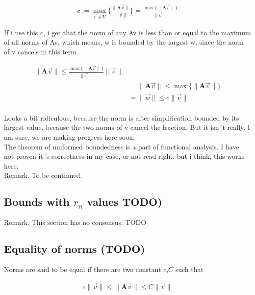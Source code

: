 \documentclass[a4paper]{article}
\begin{document}
\begin{Example}
\begin{displaymath}
\begin{align}
c := \max_{\vec{v} \in V}\{ \frac{\|\boldsymbol{A}\vec{v}\|}{\|\vec{v}\|} \} = \frac{\max\{\|\boldsymbol{A}\vec{v}\|\}}{\|\vec{v}\|}
\end{align}
\end{displaymath}

If i use this c, i get that the norm of any Av is less than or equal to the maximum of all norms of Av, which means, w is bounded by the largest w, since the norm of v cancels in this term.

\begin{displaymath}
\begin{align}
\|\boldsymbol{A}\vec{v}\| \leq \frac{\max\{\|\boldsymbol{A}\vec{v}\|\}}{\|\vec{v}\|}\|\vec{v}\| \\
&= \|\boldsymbol{A}\vec{v}\| \leq \max\{\|\boldsymbol{A}\vec{v}\|\}\\
&= \|\vec{w}\| \leq c\|\vec{v}\| \\
\end{align}
\end{displaymath}

Looks a bit ridiculous, because the norm is after simplification bounded by its largest value, because the two norms of v cancel the fraction. But it isn´t really. I am sure, we are making progress here soon.\\

The theorem of uniformed boundedness is a part of functional analysis. I have not proven it´s correctness in my case, or not read right, but i think, this works here.\\

Remark. To be continued.\\


\subsection{Bounds with $r_n$ values TODO)}

Remark. This section has no consensus. TODO

\subsection{Equality of norms (TODO)}

Norms are said to be equal if there are two constant $c$,$C$ such that

\begin{displaymath}
\begin{align}
    c\|\vec{v}\| \leq \|\boldsymbol{A}\vec{v}\| \leq C\|\vec{v}\|
\end{align}
\end{displaymath}


\end{Example}
\end{document}
